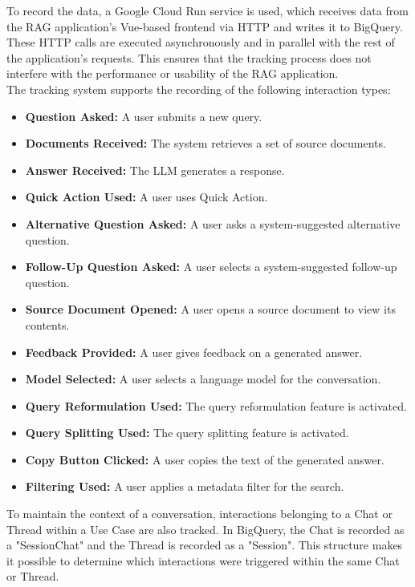 \documentclass[
	english,
	ruledheaders=section,%
	class=report,%
	thesis={type=bachelor},%
	accentcolor=1b,%
	custommargins=true,%
	marginpar=false,%
	parskip=half-,%
	fontsize=11pt,%
	DIV=14,
]{tudapub}
\begin{document}
To record the data, a Google Cloud Run service \parencite{GoogleCloudRunService} is used, which receives data from the RAG application's Vue-based \parencite{vuejs} frontend via HTTP and writes it to BigQuery. These HTTP calls are executed asynchronously and in parallel with the rest of the application's requests. This ensures that the tracking process does not interfere with the performance or usability of the RAG application.
\\
The tracking system supports the recording of the following interaction types:
\begin{itemize}
    \item \textbf{Question Asked:} A user submits a new query.
    \item \textbf{Documents Received:} The system retrieves a set of source documents.
    \item \textbf{Answer Received:} The LLM generates a response.
    \item \textbf{Quick Action Used:} A user uses Quick Action.
    \item \textbf{Alternative Question Asked:} A user asks a system-suggested alternative question.
    \item \textbf{Follow-Up Question Asked:} A user selects a system-suggested follow-up question.
    \item \textbf{Source Document Opened:} A user opens a source document to view its contents.
    \item \textbf{Feedback Provided:} A user gives feedback on a generated answer.
    \item \textbf{Model Selected:} A user selects a language model for the conversation.
    \item \textbf{Query Reformulation Used:} The query reformulation feature is activated.
    \item \textbf{Query Splitting Used:} The query splitting feature is activated.
    \item \textbf{Copy Button Clicked:} A user copies the text of the generated answer.
    \item \textbf{Filtering Used:} A user applies a metadata filter for the search.
\end{itemize}
To maintain the context of a conversation, interactions belonging to a Chat or Thread within a Use Case are also tracked. In BigQuery, the Chat is recorded as a "SessionChat" and the Thread is recorded as a "Session". This structure makes it possible to determine which interactions were triggered within the same Chat or Thread.
\end{document}
